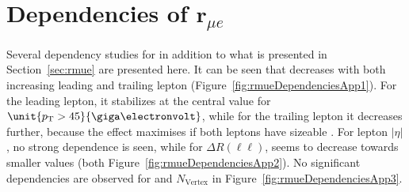 \chapter{Dependencies of $\mathbf{r}_{\mu e}$}
\label{app:rmue}
Several dependency studies for \rmue in addition to what is presented in Section~\ref{sec:rmue} are presented here. It can be seen that \rmue decreases with both increasing leading and trailing lepton \pt (Figure~\ref{fig:rmueDependenciesApp1}). For the leading lepton, it stabilizes at the central value for $\unit{\pt > 45}{\giga\electronvolt}$, while for the trailing lepton it decreases further, because the effect maximises if both leptons have sizeable \pt. For lepton $|\eta|$, no strong dependence is seen, while for $\Delta R(\ell\ell)$, \rmue seems to decrease towards smaller values (both Figure~\ref{fig:rmueDependenciesApp2}). No significant dependencies are observed for \HT and $N_{\text{Vertex}}$ in Figure~\ref{fig:rmueDependenciesApp3}. 
